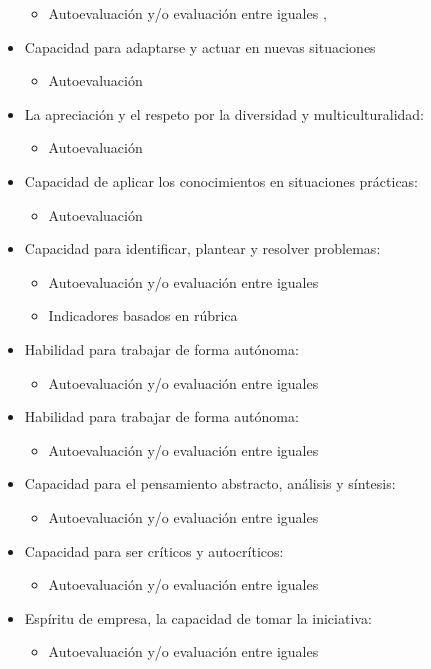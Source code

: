 \begin{itemize}
	\begin{itemize} 
	\item Autoevaluación y/o evaluación entre iguales \cite{Achcaoucaou:2012}, \cite{Liao:2013}
	\end{itemize}
\item Capacidad para adaptarse y actuar en nuevas situaciones
	\begin{itemize} 
	\item Autoevaluación \cite{Liao:2013}
	\end{itemize}
\item La apreciación y el respeto por la diversidad y multiculturalidad:
	\begin{itemize} 
	\item Autoevaluación \cite{Liao:2013}
	\end{itemize}
\item Capacidad de aplicar los conocimientos en situaciones prácticas:
	\begin{itemize} 
	\item Autoevaluación \cite{Liao:2013}
	\end{itemize}
\item Capacidad para identificar, plantear y resolver problemas:
	\begin{itemize} 
	\item Autoevaluación y/o evaluación entre iguales \cite{Achcaoucaou:2012}
	\item Indicadores basados en rúbrica \cite{Guenaga:2013}
	\end{itemize}
\item Habilidad para trabajar de forma autónoma:
	\begin{itemize} 
	\item Autoevaluación y/o evaluación entre iguales \cite{Colomo-Palacios:2013}
	\end{itemize} 
\item Habilidad para trabajar de forma autónoma:
	\begin{itemize} 
	\item Autoevaluación y/o evaluación entre iguales \cite{Colomo-Palacios:2013}
	\end{itemize} 
\item Capacidad para el pensamiento abstracto, análisis y síntesis:
	\begin{itemize} 
	\item Autoevaluación y/o evaluación entre iguales \cite{Colomo-Palacios:2013}
	\end{itemize} 
\item Capacidad para ser críticos y autocríticos:
	\begin{itemize} 
	\item Autoevaluación y/o evaluación entre iguales \cite{Colomo-Palacios:2013}
	\end{itemize} 
\item Espíritu de empresa, la capacidad de tomar la iniciativa:
	\begin{itemize} 
	\item Autoevaluación y/o evaluación entre iguales \cite{Colomo-Palacios:2013}
	\end{itemize} 
\end{itemize}

